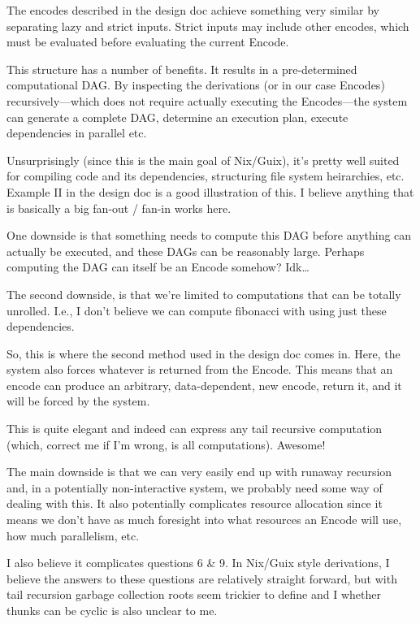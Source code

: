 \documentclass{article}
\newcommand{\bs}{\vspace{\baselineskip}}
\begin{document}
\bs

The encodes described in the design doc achieve something very similar
by separating lazy and strict inputs. Strict inputs may include other
encodes, which must be evaluated before evaluating the current Encode.

\bs

This structure has a number of benefits. It results in a
pre-determined computational DAG. By inspecting the derivations (or in
our case Encodes) recursively---which does not require actually
executing the Encodes---the system can generate a complete DAG,
determine an execution plan, execute dependencies in parallel etc.

\bs

Unsurprisingly (since this is the main goal of Nix/Guix), it's pretty
well suited for compiling code and its dependencies, structuring file
system heirarchies, etc. Example II in the design doc is a good
illustration of this. I believe anything that is basically a big
fan-out / fan-in works here.

\bs

One downside is that something needs to compute this DAG before
anything can actually be executed, and these DAGs can be reasonably
large. Perhaps computing the DAG can itself be an Encode somehow?
Idk\ldots

\bs

The second downside, is that we're limited to computations that can be totally unrolled. I.e., I don't believe we can compute fibonacci with using just these dependencies.

\bs

So, this is where the second method used in the design doc comes
in. Here, the system also forces whatever is returned from the
Encode. This means that an encode can produce an arbitrary,
data-dependent, new encode, return it, and it will be forced by the
system.

\bs

This is quite elegant and indeed can express any tail recursive computation (which, correct me if I'm wrong, is all computations). Awesome!

\bs

The main downside is that we can very easily end up with runaway
recursion and, in a potentially non-interactive system, we probably
need some way of dealing with this. It also potentially complicates
resource allocation since it means we don't have as much foresight
into what resources an Encode will use, how much parallelism, etc.

\bs

I also believe it complicates questions 6 \& 9. In Nix/Guix style
derivations, I believe the answers to these questions are relatively
straight forward, but with tail recursion garbage collection roots
seem trickier to define and I whether thunks can be cyclic is also
unclear to me.
\end{document}
